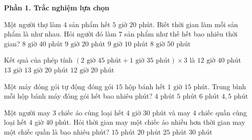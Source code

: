 \textbf{Phần 1. Trắc nghiệm lựa chọn}

\begin{ex} %
Một người thợ làm $4$ sản phẩm hết $5$ giờ $20$ phút. Biết thời gian làm mỗi sản phẩm là như nhau. Hỏi người đó làm $7$ sản phẩm như thế hết bao nhiêu thời gian?
\choice
{$8\text{ giờ } 40\text{ phút}$}
{\True $9\text{ giờ } 20\text{ phút}$}
{$9\text{ giờ } 10\text{ phút}$}
{$8\text{ giờ } 50\text{ phút}$}
\end{ex}

\begin{ex} %
Kết quả của phép tính $(2\text{ giờ } 45\text{ phút} + 1\text{ giờ } 35\text{ phút}) \times 3$ là
\choice
{$12\text{ giờ } 40\text{ phút}$}
{\True $13\text{ giờ}$}
{$13\text{ giờ } 20\text{ phút}$}
{$12\text{ giờ } 20\text{ phút}$}
\end{ex}

\begin{ex} %
Một máy đóng gói tự động đóng gói $15$ hộp bánh hết $1$ giờ $15$ phút. Trung bình mỗi hộp bánh máy đóng gói hết bao nhiêu phút?
\choice
{$4\text{ phút}$}
{\True $5\text{ phút}$}
{$6\text{ phút}$}
{$4{,}5\text{ phút}$}
\end{ex}

\begin{ex} %
Một người may $3$ chiếc áo cùng loại hết $4$ giờ $30$ phút và may $4$ chiếc quần cùng loại hết $4$ giờ $40$ phút. Hỏi thời gian may một chiếc áo nhiều hơn thời gian may một chiếc quần là bao nhiêu phút?
\choice
{$15\text{ phút}$}
{\True $20\text{ phút}$}
{$25\text{ phút}$}
{$30\text{ phút}$}
\end{ex}

